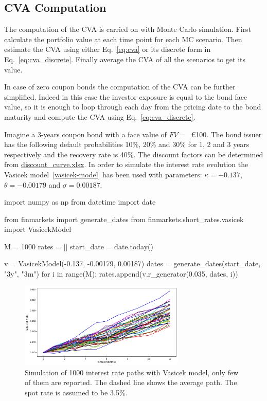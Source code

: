 \subsection{CVA Computation}

The computation of the CVA is carried on with Monte Carlo simulation. 
First calculate the portfolio value at each time point for each MC scenario. Then estimate the CVA using either Eq.~\ref{eq:cva} or its discrete form in Eq.~\ref{eq:cva_discrete}. Finally average the CVA of all the scenarios to get its value.

In case of zero coupon bonds the computation of the CVA can be further simplified. Indeed in this case the investor exposure is equal to the bond face value, so it is enough to loop through each day from the pricing date to the bond maturity and compute the CVA using Eq.~\ref{eq:cva_discrete}.

Imagine a 3-years coupon bond with a face value of $FV=$~\euro{100}. The bond issuer has the following default probabilities 10\%, 20\% and 30\% for 1, 2 and 3 years respectively and the recovery rate is 40\%. The discount factors can be determined from \href{https://github.com/matteosan1/finance_course/raw/master/input_files/discount_factors_2022-10-05.xlsx}{discount\_curve.xlsx}.
In order to simulate the interest rate evolution the Vasicek model~\ref{vasicek-model} has been used with parameters: $\kappa=-0.137$, $\theta=-0.00179$ and $\sigma=0.00187$. 

\begin{ipython}
import numpy as np
from datetime import date

from finmarkets import generate_dates
from finmarkets.short_rates.vasicek import VasicekModel

M = 1000
rates = []
start_date = date.today()

v = VasicekModel(-0.137, -0.00179, 0.00187)
dates = generate_dates(start_date, "3y", "3m")
for i in range(M):
    rates.append(v.r_generator(0.035, dates, i))
\end{ipython}

\begin{figure}[htb]
\centering
\includegraphics[width=0.7\textwidth]{figures/vasicek_simulation}
\caption{Simulation of 1000 interest rate paths with Vasicek model, only few of them are reported. The dashed line shows the average path. The spot rate is assumed to be 3.5\%.}
\label{fig:vasicek_simulation}
\end{figure} 

